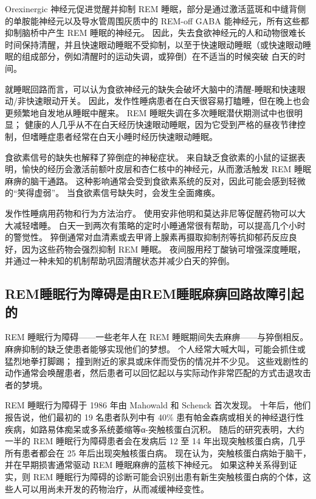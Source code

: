 Orexinergic 神经元促进觉醒并抑制 REM 睡眠，部分是通过激活蓝斑和中缝背侧的单胺能神经元以及导水管周围灰质中的 REM-off GABA 能神经元，所有这些都抑制脑桥中产生 REM 睡眠的神经元。
因此，失去食欲神经元的人和动物很难长时间保持清醒，并且快速眼动睡眠不受抑制，以至于快速眼动睡眠（或快速眼动睡眠的组成部分，例如清醒时的运动失调，或猝倒）在不适当的时候突破 白天的时间。


就睡眠回路而言，可以认为食欲神经元的缺失会破坏大脑中的清醒-睡眠和快速眼动/非快速眼动开关。
因此，发作性睡病患者在白天很容易打瞌睡，但在晚上也会更频繁地自发地从睡眠中醒来。
REM 睡眠失调在多次睡眠潜伏期测试中也很明显；
健康的人几乎从不在白天经历快速眼动睡眠，因为它受到严格的昼夜节律控制，但嗜睡症患者经常在白天小睡时经历快速眼动睡眠。


食欲素信号的缺失也解释了猝倒症的神秘症状。
来自缺乏食欲素的小鼠的证据表明，愉快的经历会激活前额叶皮层和杏仁核中的神经元，从而激活触发 REM 睡眠麻痹的脑干通路。
这种影响通常会受到食欲素系统的反对，因此可能会感到轻微的“笑得虚弱”。
当食欲素信号缺失时，会发生全面瘫痪。


发作性睡病用药物和行为方法治疗。
使用安非他明和莫达非尼等促醒药物可以大大减轻嗜睡。
白天一到两次有策略的定时小睡通常很有帮助，可以提高几个小时的警觉性。
猝倒通常对血清素或去甲肾上腺素再摄取抑制剂等抗抑郁药反应良好，因为这些药物会强烈抑制 REM 睡眠。
夜间服用羟丁酸钠可增强深度睡眠，并通过一种未知的机制帮助巩固清醒状态并减少白天的猝倒。



\subsection{REM睡眠行为障碍是由REM睡眠麻痹回路故障引起的}

REM 睡眠行为障碍——一些老年人在 REM 睡眠期间失去麻痹——与猝倒相反。
麻痹抑制的缺乏使患者能够实现他们的梦想。
个人经常大喊大叫，可能会抓住或猛烈地拳打脚踢；
撞到附近的家具或床伴而受伤的情况并不少见。
这些戏剧性的动作通常会唤醒患者，然后患者可以回忆起以与实际动作非常匹配的方式击退攻击者的梦境。


REM 睡眠行为障碍于 1986 年由 Mahowald 和 Schenck 首次发现。
十年后，他们报告说，他们最初的 19 名患者队列中有 40\% 患有帕金森病或相关的神经退行性疾病，如路易体痴呆或多系统萎缩等α-突触核蛋白沉积。
随后的研究表明，大约一半的 REM 睡眠行为障碍患者会在发病后 12 至 14 年出现突触核蛋白病，几乎所有患者都会在 25 年后出现突触核蛋白病。
现在认为，突触核蛋白病始于脑干，并在早期损害通常驱动 REM 睡眠麻痹的蓝核下神经元。
如果这种关系得到证实，则 REM 睡眠行为障碍的诊断可能会识别出患有新生突触核蛋白病的个体，这些人可以用尚未开发的药物治疗，从而减缓神经变性。



